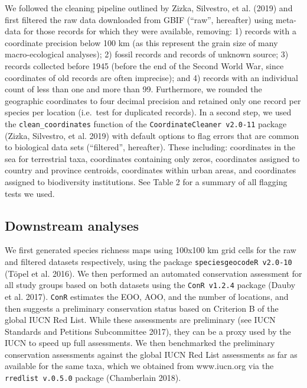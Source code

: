 \documentclass[fleqn,10pt,lineno]{wlpeerj} %
\begin{document}
We followed the cleaning pipeline outlined by Zizka, Silvestro, et al. (2019) and first filtered the raw data downloaded from GBIF (``raw'', hereafter) using meta-data for those records for which they were available, removing: 1) records with a coordinate precision below 100 km (as this represent the grain size of many macro-ecological analyses); 2) fossil records and records of unknown source; 3) records collected before 1945 (before the end of the Second World War, since coordinates of old records are often imprecise); and 4) records with an individual count of less than one and more than 99. Furthermore, we rounded the geographic coordinates to four decimal precision and retained only one record per species per location (i.e.~test for duplicated records). In a second step, we used the \texttt{clean\_coordinates} function of the \texttt{CoordinateCleaner\ v2.0-11} package (Zizka, Silvestro, et al. 2019) with default options to flag errors that are common to biological data sets (``filtered'', hereafter). These including: coordinates in the sea for terrestrial taxa, coordinates containing only zeros, coordinates assigned to country and province centroids, coordinates within urban areas, and coordinates assigned to biodiversity institutions. See Table 2 for a summary of all flagging tests we used.

\hypertarget{downstream-analyses}{%
\subsection*{Downstream analyses}\label{downstream-analyses}}

We first generated species richness maps using 100x100 km grid cells for the raw and filtered datasets respectively, using the package \texttt{speciesgeocodeR\ v2.0-10} (Töpel et al. 2016). We then performed an automated conservation assessment for all study groups based on both datasets using the \texttt{ConR\ v1.2.4} package (Dauby et al. 2017). \texttt{ConR} estimates the EOO, AOO, and the number of locations, and then suggests a preliminary conservation status based on Criterion B of the global IUCN Red List. While these assessments are preliminary (see IUCN Standards and Petitions Subcommittee 2017), they can be a proxy used by the IUCN to speed up full assessments. We then benchmarked the preliminary conservation assessments against the global IUCN Red List assessments as far as available for the same taxa, which we obtained from www.iucn.org via the \texttt{rredlist\ v.0.5.0} package (Chamberlain 2018).
\end{document}
